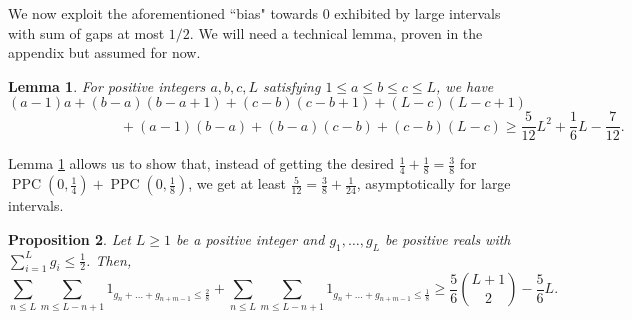 \documentclass[12pt]{amsart}
\newtheorem{proposition}{Proposition}[section]
\newtheorem{lemma}[proposition]{Lemma}
\theoremstyle{definition}
\newcommand{\vs}{\vspace{3mm}}
\DeclareMathOperator{\PPC}{PPC}
\begin{document}
\vs

We now exploit the aforementioned ``bias" towards $0$ exhibited by large intervals with sum of gaps at most $1/2$. We will need a technical lemma, proven in the appendix but assumed for now.

\vs

\begin{lemma}\label{5/12lemma}
For positive integers $a,b,c,L$ satisfying $1 \le a \le b \le c \le L$, we have  $$(a-1)a+(b-a)(b-a+1)+(c-b)(c-b+1)+(L-c)(L-c+1) \qquad \qquad$$ $$\qquad \qquad \qquad \qquad +(a-1)(b-a)+(b-a)(c-b)+(c-b)(L-c) \ge \frac{5}{12}L^2+\frac{1}{6}L-\frac{7}{12}.$$
\end{lemma}

\vs

Lemma \ref{5/12lemma} allows us to show that, instead of getting the desired $\frac{1}{4}+\frac{1}{8} = \frac{3}{8}$ for $\PPC(0,\frac{1}{4})+\PPC(0,\frac{1}{8})$, we get at least $\frac{5}{12} = \frac{3}{8}+\frac{1}{24}$, asymptotically for large intervals.

\vspace{1mm}

\begin{proposition}\label{biasnear0}
Let $L \ge 1$ be a positive integer and $g_1,\dots,g_L$ be positive reals with $\sum_{i=1}^L g_i \le \frac{1}{2}$. Then, $$\sum_{n \le L}\sum_{m \le L-n+1} 1_{g_n+\dots+g_{n+m-1} \le \frac{2}{8}}+\sum_{n \le L}\sum_{m \le L-n+1} 1_{g_n+\dots+g_{n+m-1} \le \frac{1}{8}} \ge \frac{5}{6}\binom{L+1}{2} - \frac{5}{6}L.$$
\end{proposition}
\end{document}
